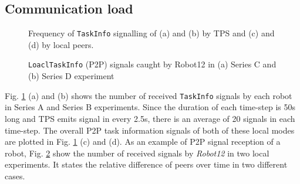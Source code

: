 \documentclass[journal]{IEEEtran}
\begin{document}
\subsection{Communication load}
\begin{figure}
\centering
{}
\newline
{}
\newline
{}
\newline
{}
\newline
\caption{Frequency of \texttt{TaskInfo} signalling of (a) and (b) by TPS and (c) and (d) by local peers.}
\label{fig:signal-frequency-stat}
\end{figure}
\begin{figure}
\begin{centering}
\newline
{}
\newline
\caption{\small \texttt{LoaclTaskInfo} (P2P) signals caught by Robot12 in (a) Series C and (b) Series D experiment}
\end{centering}
\label{fig:local-single-robot-signal}
\end{figure}
Fig. \ref{fig:signal-frequency-stat} (a) and (b) shows the number of received \texttt{TaskInfo} signals by each robot in Series A and Series B experiments. Since the duration of each time-step is 50s long and TPS emits signal in every 2.5s, there is an average of 20 signals in each time-step. The overall P2P task information signals of both of these local modes are plotted in Fig. \ref{fig:signal-frequency-stat} (c) and (d). As an example of P2P signal reception of a robot,  Fig. \ref{fig:local-single-robot-signal} show the number of received signals by \textit{Robot12} in two local experiments. It states the relative difference of peers over time in two different cases.
\end{document}
